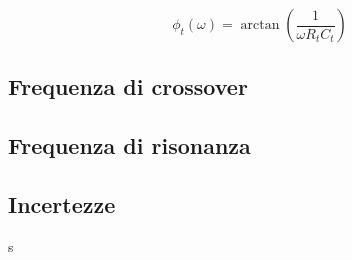\documentclass[12pt,italian]{article}
\begin{document}
\begin{equation}
	\phi_{t}(\omega) = \arctan\left(\frac{1}{\omega R_{t} C_{t}}\right)
\end{equation}

\subsection{Frequenza di crossover}
\label{sec:crossFreq}

\subsection{Frequenza di risonanza}
\label{sec:resFreq}

\subsection{Incertezze}
s
\end{document}
